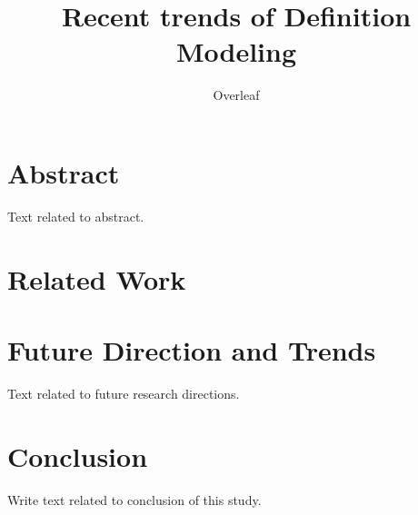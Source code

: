 \documentclass[a4paper,10pt]{article}
\title{Recent trends of Definition Modeling}
\author{Overleaf}
\begin{document}
\maketitle

\section{Abstract}
Text related to abstract.



\section{Related Work}





\cite{fourrier_methodological_2020}

\section{Future Direction and Trends}
Text related to future research directions.

\section{Conclusion}
Write text related to conclusion of this study.



\end{document}
